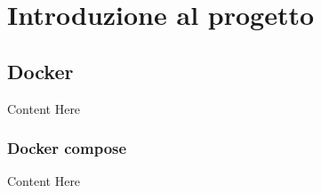 \documentclass[../DocumentazioneProgetto.tex]{subfiles}
\begin{document}
	\section{Introduzione al progetto}
	
\subsection{Docker} 
	Content Here
	\subsubsection{Docker compose} 
	Content Here
\end{document}
